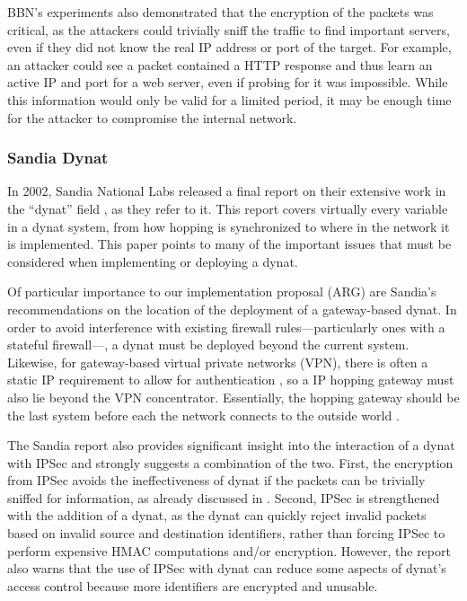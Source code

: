 \par BBN's experiments also demonstrated that the encryption of the packets was critical, as the attackers could trivially sniff the traffic to find important servers, even if they did not know the real IP address or port of the target. For example, an attacker could see a packet contained a HTTP response and thus learn an active IP and port for a web server, even if probing for it was impossible. While this information would only be valid for a limited period, it may be enough time for the attacker to compromise the internal network.

\subsubsection{Sandia Dynat}
\par In 2002, Sandia National Labs released a final report on their extensive work in the ``dynat'' field \cite{SandiaDynat}, as they refer to it. This report covers virtually every variable in a dynat system, from how hopping is synchronized to where in the network it is implemented. This paper points to many of the important issues that must be considered when implementing or deploying a dynat.

\par Of particular importance to our implementation proposal (ARG) are Sandia's recommendations on the location of the deployment of a gateway-based dynat. In order to avoid interference with existing firewall rules---particularly ones with a stateful firewall---, a dynat must be deployed beyond the current system. Likewise, for gateway-based virtual private networks (VPN), there is often a static IP requirement to allow for authentication \cite{SandiaDynat}, so a IP hopping gateway must also lie beyond the VPN concentrator. Essentially, the hopping gateway should be the last system before each the network connects to the outside world \cite{SandiaDynat}.

\par The Sandia report also provides significant insight into the interaction of a dynat with IPSec and strongly suggests a combination of the two. First, the encryption from IPSec avoids the ineffectiveness of dynat if the packets can be trivially sniffed for information, as already discussed in \cite{BBNDYNAT}. Second, IPSec is strengthened with the addition of a dynat, as the dynat can quickly reject invalid packets based on invalid source and destination identifiers, rather than forcing IPSec to perform expensive HMAC computations and/or encryption. However, the report also warns that the use of IPSec with dynat can reduce some aspects of dynat's access control because more identifiers are encrypted and unusable.

